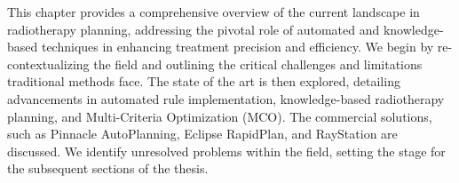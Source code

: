 This chapter provides a comprehensive overview of the current landscape in radiotherapy planning, addressing the pivotal role of automated and knowledge-based techniques in enhancing treatment precision and efficiency.
We begin by re-contextualizing the field and outlining the critical challenges and limitations traditional methods face.
The state of the art is then explored, detailing advancements in automated rule implementation, knowledge-based radiotherapy planning, and Multi-Criteria Optimization (MCO).
The commercial solutions, such as Pinnacle AutoPlanning, Eclipse RapidPlan, and RayStation are discussed.
We identify unresolved problems within the field, setting the stage for the subsequent sections of the thesis.
